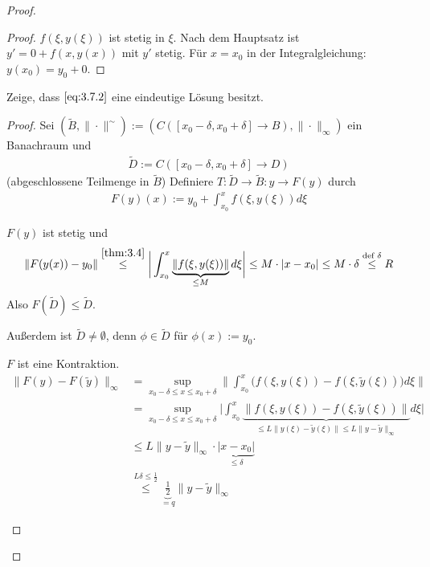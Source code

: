 \begin{theorem}
\begin{proof}
\begin{enum-arab}
\begin{proof}
        $f(\xi, y(\xi))$ ist stetig in $\xi$.
        Nach dem Hauptsatz ist $y' = 0 + f(x, y(x))$ mit $y'$ stetig.
        Für $x = x_0$ in der Integralgleichung: $y(x_0) = y_0 + 0$.
      \end{proof}
    \item
      Zeige, dass $\eqref{eq:3.7.2}$ eine eindeutige Lösung besitzt.
      \begin{proof}
        Sei $(\tilde B, \|\cdot\|^{\sim}) := (C([x_0-\delta, x_0+\delta] \to B), \|\cdot\|_\infty)$ ein Banachraum und
        \begin{align*}
          \tilde D := C([x_0 -\delta, x_0 + \delta] \to D) 
        \end{align*}
        (abgeschlossene Teilmenge in $\tilde B$)
        Definiere $T: \tilde D \to \tilde B : y \to F(y)$ durch
        \begin{align*}
          F(y)(x) := y_0 + \int_{x_0}^x f(\xi, y(\xi)) d\xi
        \end{align*}
        \begin{enum-alph}
        \item
          $F(y)$ ist stetig und
          \begin{align*}
            \|F(y(x)) - y_0 \|
            \stackrel{\ref{thm:3.4}}\le \bigg| \int_{x_0}^x \underbrace{\|f(\xi, y(\xi))\|}_{\le M} d\xi \bigg|
            \le M \cdot |x - x_0|
            \le M \cdot \delta
            \stackrel{\text{def } \delta}\le R
          \end{align*}
          Also $F(\tilde D ) \le \tilde D$.
        \item
          Außerdem ist $\tilde D \neq \emptyset$, denn $\phi \in \tilde D$ für $\phi(x) := y_0$.
        \item
          $F$ ist eine Kontraktion.
          \begin{align*}
            \|F(y) - F(\tilde y)\|_\infty
            &= \sup_{x_0-\delta \le x \le x_0+\delta} \bigg\| \int_{x_0}^x \Big( f(\xi, y(\xi)) - f(\xi, \tilde y(\xi)) \Big) d\xi \bigg\| \\
            &= \sup_{x_0-\delta \le x \le x_0+\delta} \bigg| \int_{x_0}^x \underbrace{\Big\| f(\xi, y(\xi)) - f(\xi, \tilde y(\xi)) \Big\|}_{\le L \|y(\xi)-\tilde y(\xi)\| \le L \|y-\tilde y\|_\infty} d\xi \bigg| \\
            &\le L \|y-\tilde y\|_\infty \cdot \underbrace{|x-x_0|}_{\le \delta} \\
            &\stackrel{L \delta \le \frac 12} \le \underbrace{\frac 12}_{=q} \|y-\tilde y\|_\infty

\end{align*}
\end{enum-alph}
\end{proof}
\end{enum-arab}
\end{proof}
\end{theorem}
